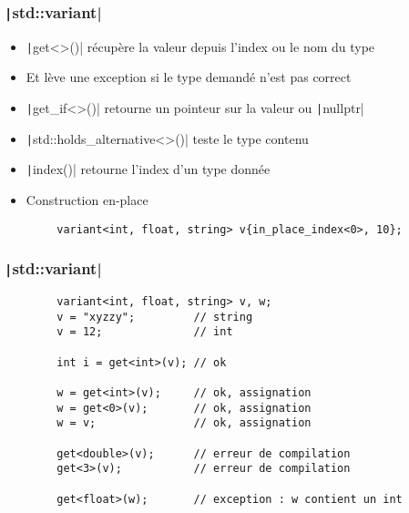 \documentclass[C++.tex]{subfiles}
\begin{document}
\begin{frame}[fragile]
	\frametitle{\texttt|std::variant|}
	\begin{itemize}
		\item \texttt|get<>()| récupère la valeur depuis l'index ou le nom du type
		\item Et lève une exception si le type demandé n'est pas correct
		\item \texttt|get_if<>()| retourne un pointeur sur la valeur ou \texttt|nullptr|
		\item \texttt|std::holds_alternative<>()| teste le type contenu
		\item \texttt|index()| retourne l'index d'un type donnée
		\item Construction en-place
	\end{itemize}

	\begin{verbatim}
		variant<int, float, string> v{in_place_index<0>, 10};
	\end{verbatim}

\end{frame}

\begin{frame}[fragile]
	\frametitle{\texttt|std::variant|}
	\begin{verbatim}
		variant<int, float, string> v, w;
		v = "xyzzy";         // string
		v = 12;              // int

		int i = get<int>(v); // ok

		w = get<int>(v);     // ok, assignation
		w = get<0>(v);       // ok, assignation
		w = v;               // ok, assignation

		get<double>(v);      // erreur de compilation
		get<3>(v);           // erreur de compilation

		get<float>(w);       // exception : w contient un int
	\end{verbatim}

\end{frame}
\end{document}
